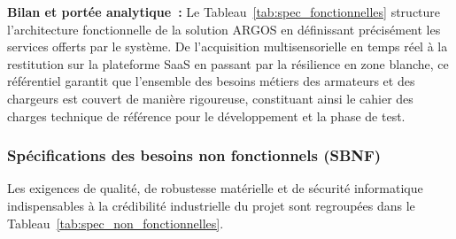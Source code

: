 \noindent \textbf{Bilan et portée analytique~:} 
Le Tableau~\ref{tab:spec_fonctionnelles} structure l'architecture fonctionnelle de la solution ARGOS en définissant précisément les services offerts par le système. De l'acquisition multisensorielle en temps réel à la restitution sur la plateforme SaaS en passant par la résilience en zone blanche, ce référentiel garantit que l'ensemble des besoins métiers des armateurs et des chargeurs est couvert de manière rigoureuse, constituant ainsi le cahier des charges technique de référence pour le développement et la phase de test.

\subsubsection{Spécifications des besoins non fonctionnels (SBNF)}

Les exigences de qualité, de robustesse matérielle et de sécurité informatique indispensables à la crédibilité industrielle du projet sont regroupées dans le Tableau~\ref{tab:spec_non_fonctionnelles}.

